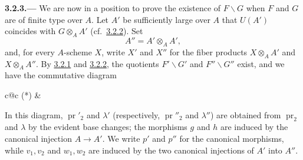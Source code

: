 
\medskip
{}\label{par:sga3-VIA-3.2.3}%
\noindent\textbf{3.2.3.---}
We are now in a position to prove the existence of
\(F\backslash G\) when \(F\) and \(G\) are of finite type over
\(A\). Let \(A'\) be sufficiently large over \(A\) that
\(U(A')\) coincides with \(G\otimes_AA'\) (cf.\ \hyperref[par:sga3-VIA-3.2.2]{3.2.2}). Set
\[
  A''=A'\otimes_AA',
\]
and, for every \(A\)-scheme \(X\), write \(X'\) and \(X''\) for
the fiber products \(X\otimes_AA'\) and \(X\otimes_AA''\).
By \hyperref[par:sga3-VIA-3.2.1]{3.2.1} and \hyperref[par:sga3-VIA-3.2.2]{3.2.2}, the quotients \(F'\backslash G'\) and
\(F''\backslash G''\) exist, and we have the commutative diagram
\begin{center}
  \label{diag:sga3-VIA-3.2.3-exact-descent}%
  \begin{tabular}{c@{\qquad}c}
    \textup{(*)}
    &
  \end{tabular}
\end{center}

In this diagram, \(\operatorname{pr}'_2\) and \(\lambda'\)
(respectively, \(\operatorname{pr}''_2\) and \(\lambda''\)) are
obtained from \(\operatorname{pr}_2\) and \(\lambda\) by the evident
base changes; the morphisms \(g\) and \(h\) are induced by the
canonical injection \(A\to A'\). We write \(p'\) and \(p''\) for the
canonical morphisms, while \(v_1,v_2\) and \(w_1,w_2\) are induced
by the two canonical injections of \(A'\) into \(A''\).

